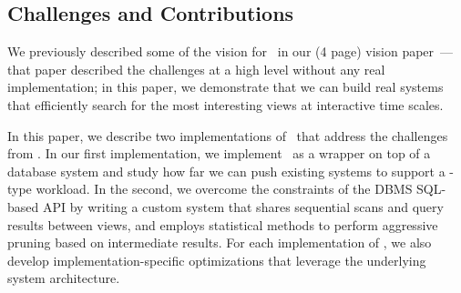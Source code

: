 \subsection*{Challenges and Contributions}
We previously described some of the vision for  \SeeDB\ in our (4 page)
vision paper~\cite{DBLP:conf/vldb/Parameswaran2013}---that paper described the
challenges at a high level without any real implementation; in this paper, we
demonstrate that we can build real systems that efficiently search for the most
interesting views at interactive time scales.

In this paper, we describe two implementations of \SeeDB\ that address the
challenges from \cite{DBLP:conf/vldb/Parameswaran2013}.
In our first implementation, we implement \SeeDB\ as a wrapper on top of a
database system and study how far we can push existing systems to support a
\SeeDB-type workload.
In the second, we overcome the constraints of the DBMS SQL-based API by writing a custom system
that  shares sequential scans and query results between views, and employs
statistical methods to perform aggressive pruning
based on intermediate results.
For each implementation of \SeeDB, we also develop implementation-specific
optimizations that leverage the underlying system architecture.

